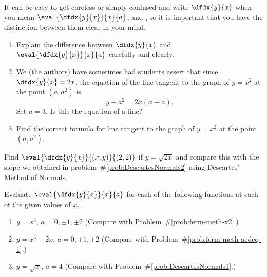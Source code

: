   It can be easy to get careless or simply confused and write $\dfdx{y}{x}$
  when you mean $\eval{\dfdx{y}{x}}{x}{a}$, and ,
  so it is important that you have the distinction between them clear
  in your mind.

\begin{embeddedproblem-enumerate}
  \begin{enumerate}[label={\bf{}(\alph*)}]
    \item Explain the difference between $\dfdx{y}{x}$ and
      $\eval{\dfdx{y}{x}}{x}{a}$ carefully and clearly.
    \item We (the authors) have sometimes had students assert that
      since $\dfdx{y}{x}=2x$, the equation of the line tangent to the
      graph of $y=x^2$ at the point $(a, a^2)$ is
      \begin{equation}
      y-a^2=2x(x-a).\label{eq:TanLineNoLine}
    \end{equation}
    Set $a=3$. Is this the equation of a line?
  \item Find the correct formula for line tangent to the graph of
    $y=x^2$ at the point $(a, a^2)$.  
  \end{enumerate}
\end{embeddedproblem-enumerate}

\begin{ProficiencyDrill}
  Find $\eval{\dfdx{y}{x}}{(x,y)}{(2,2)}$ if $y=\sqrt{2x}$ and compare this with the slope
  we obtained in problem~\#\ref{prob:DescartesNormals2} using
  Descartes' Method of Normals.
\end{ProficiencyDrill}


  \begin{embeddedproblem}
    \label{embedded:Deri}
    Evaluate $\eval{\dfdx{y}{x}}{x}{a}$ for each of the following
    functions at each of the given values of $x$.
    \begin{enumerate}[label={\bf{}(\alph*)}]{}
    \item $y=x^3$, $a=0,\pm1,\pm2$ (Compare with
      Problem~\#\ref{prob:ferm-meth-x2}.)
    \item $y=x^3+2x$, $a=0,\pm1,\pm2$ (Compare with
      Problem~\#\ref{prob:ferm-meth-aedeq-1}.)
    \item $y=\sqrt{x}$, $a=4$ (Compare with
      Problem~\#\ref{prob:DescartesNormals1}.)
    \end{enumerate}
  \end{embeddedproblem}

